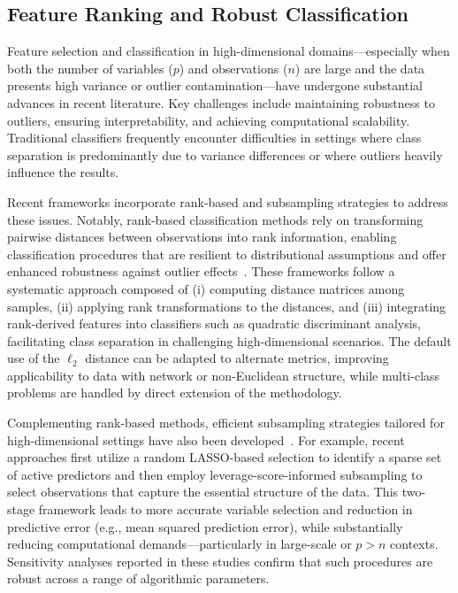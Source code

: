 \documentclass[sigconf]{acmart}
\begin{document}
\subsection{Feature Ranking and Robust Classification}

Feature selection and classification in high-dimensional domains—especially when both the number of variables ($p$) and observations ($n$) are large and the data presents high variance or outlier contamination—have undergone substantial advances in recent literature. Key challenges include maintaining robustness to outliers, ensuring interpretability, and achieving computational scalability. Traditional classifiers frequently encounter difficulties in settings where class separation is predominantly due to variance differences or where outliers heavily influence the results. 

Recent frameworks incorporate rank-based and subsampling strategies to address these issues. Notably, rank-based classification methods rely on transforming pairwise distances between observations into rank information, enabling classification procedures that are resilient to distributional assumptions and offer enhanced robustness against outlier effects~\cite{ref103}. These frameworks follow a systematic approach composed of (i) computing distance matrices among samples, (ii) applying rank transformations to the distances, and (iii) integrating rank-derived features into classifiers such as quadratic discriminant analysis, facilitating class separation in challenging high-dimensional scenarios. The default use of the $\ell_2$ distance can be adapted to alternate metrics, improving applicability to data with network or non-Euclidean structure, while multi-class problems are handled by direct extension of the methodology.

Complementing rank-based methods, efficient subsampling strategies tailored for high-dimensional settings have also been developed~\cite{ref102}. For example, recent approaches first utilize a random LASSO-based selection to identify a sparse set of active predictors and then employ leverage-score-informed subsampling to select observations that capture the essential structure of the data. This two-stage framework leads to more accurate variable selection and reduction in predictive error (e.g., mean squared prediction error), while substantially reducing computational demands—particularly in large-scale or $p > n$ contexts. Sensitivity analyses reported in these studies confirm that such procedures are robust across a range of algorithmic parameters.
\end{document}
